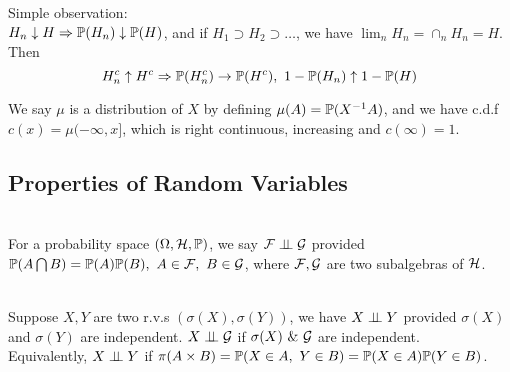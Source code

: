 \np Simple observation:\\
$H_n \downarrow H \Rightarrow \P(H_n) \downarrow \P(H)$, and if $H_1 \supset H_2 \supset \dots$, we have $\lim_n H_n = \cap_n H_n = H$. Then 
\begin{equation*}
    H_n^c \uparrow H^c \Rightarrow \P(H_n^c) \to \P(H^c),\ 1 - \P(H_n) \uparrow 1 - \P(H) 
\end{equation*}

\np We say $\mu$ is a distribution of $X$ by defining $\mu(A) = \P(X^{-1} A)$, and we have c.d.f $c(x) = \mu(-\infty,x]$, which is right continuous, increasing and $c(\infty) = 1$.

\vspace{12pt}
\subsection{Properties of Random Variables}
\begin{definition}[Independence]\ \\
For a probability space $(\Omega, \Hs,\P)$, we say $\Fs \indep \Gs$ provided $\P(A \cap B) = \P(A) \P(B),\ A \in \Fs,\ B \in \Gs$, where $\Fs,\Gs$ are two subalgebras of $\Hs$.
\end{definition}

\begin{remark}\ \\
Suppose $X,Y$ are two r.v.s $(\sigma(X), \sigma(Y))$, we have $ X \indep Y$ provided $\sigma(X)$ and $\sigma(Y)$ are independent. $X \indep \Gs$ if $\sigma(X)\ \&\ \Gs$ are independent.\\
Equivalently, $X \indep Y$ if $\pi(A \times B) = \P(X \in A,\ Y \in B) = \P(X \in A) \P(Y \in B)$.
\end{remark}


